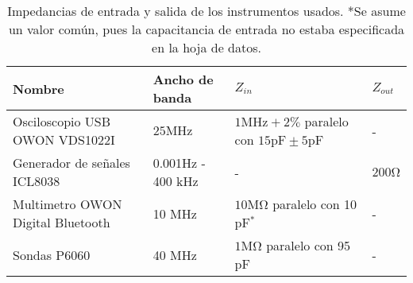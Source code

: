 \begin{table*}[!ht]
    \centering
    \begin{tabular}{|l|l|l|l|}
    \hline
        Nombre & Ancho de banda & $Z_{in}$ & $Z_{out}$ \\ \hline
        Osciloscopio USB OWON VDS1022I & $25\si{\mega\hertz}$ & $1\si{\mega\hertz}+2\%$ paralelo con $15\si{\pico\farad}  \pm 5\si{\pico\farad}$ & - \\ \hline
        Generador de señales ICL8038 & 0.001Hz - 400 kHz & - & $200\si{\ohm}$ \\ \hline
        Multimetro OWON Digital Bluetooth & 10 MHz & $10\si{\mega\ohm}$ paralelo con  10 pF$^{*}$& - \\ \hline
        Sondas P6060 & 40 MHz & $1\si{\mega\ohm}$ paralelo con 95 pF & - \\ \hline
    \end{tabular}
    \caption{Impedancias de entrada y salida de los instrumentos usados. *Se asume un valor común, pues la capacitancia de entrada no estaba especificada en la hoja de datos.}
    \label{tab:instruments-specs}
\end{table*}